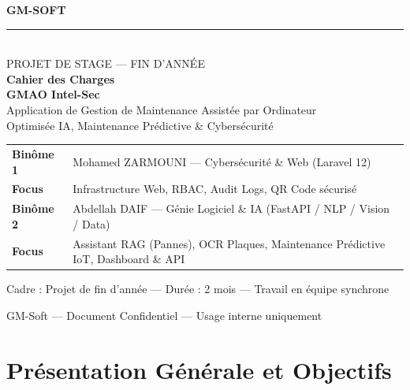 \documentclass[11pt,a4paper]{article}
\begin{document}
\begin{titlepage}
\centering
\vspace*{1.2cm}

{\Large \textbf{GM-SOFT}} \\[0.2cm]
{\color{accentteal}\rule{0.4\linewidth}{1pt}}\\[0.6cm]

{\large PROJET DE STAGE — FIN D'ANNÉE}\\[1.5cm]

{\Huge \textbf{\color{primaryblue} Cahier des Charges}}\\[0.4cm]
{\Large \textbf{\color{accentteal} GMAO Intel-Sec}}\\[0.5cm]

{\large Application de Gestion de Maintenance Assistée par Ordinateur\\
Optimisée IA, Maintenance Prédictive \& Cybersécurité}\\[2cm]

\begin{tcolorbox}[enhanced, colback=lightgray, colframe=primaryblue,
  boxrule=0.8pt, arc=3pt, width=0.85\linewidth, left=14pt, right=14pt, top=10pt, bottom=10pt]
\begin{tabularx}{\linewidth}{@{}L{4.2cm}X@{}}
\textbf{Binôme 1} & Mohamed ZARMOUNI — Cybersécurité \& Web (Laravel 12) \\
\textbf{Focus} & Infrastructure Web, RBAC, Audit Logs, QR Code sécurisé \\[0.3cm]
\textbf{Binôme 2} & Abdellah DAIF — Génie Logiciel \& IA (FastAPI / NLP / Vision / Data) \\
\textbf{Focus} & Assistant RAG (Pannes), OCR Plaques, Maintenance Prédictive IoT, Dashboard \& API \\
\end{tabularx}
\end{tcolorbox}

\vspace{1.5cm}
{\normalsize Cadre : Projet de fin d'année — Durée : 2 mois — Travail en équipe synchrone}

\vfill
{\small \textcolor{midgray}{GM-Soft — Document Confidentiel — Usage interne uniquement}}
\end{titlepage}

\tableofcontents
\newpage

\section{Présentation Générale et Objectifs}
\end{document}

